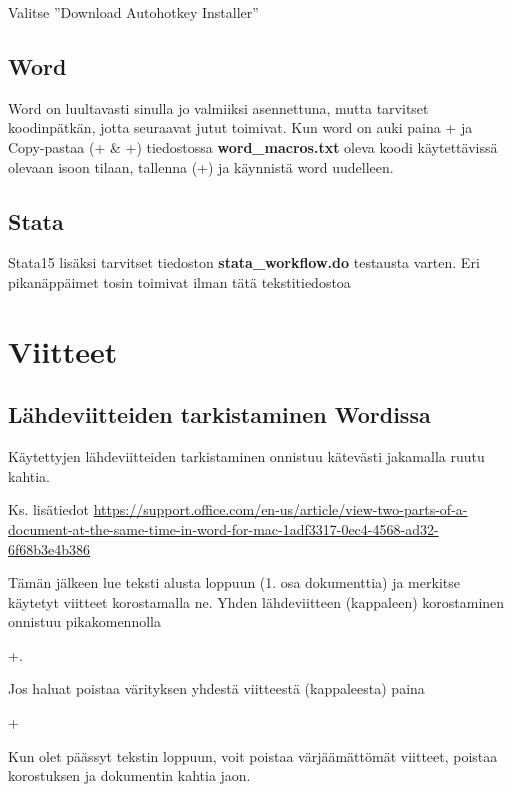 \documentclass[a5paper,9pt]{scrartcl}
\begin{document}
    Valitse ''Download Autohotkey Installer''
    \subsection{Word}
    Word on luultavasti sinulla  jo valmiiksi asennettuna, mutta tarvitset koodinpätkän, jotta seuraavat jutut toimivat. Kun word on auki paina + ja Copy-pastaa (+ \& +) tiedostossa \textbf{word\_macros.txt} oleva koodi käytettävissä olevaan isoon tilaan, tallenna (+) ja käynnistä word uudelleen.
    
    \subsection{Stata}
    Stata15 lisäksi tarvitset tiedoston \textbf{stata\_workflow.do} testausta varten. Eri pikanäppäimet tosin toimivat ilman tätä tekstitiedostoa

    
    \section{Viitteet}
    \subsection{Lähdeviitteiden tarkistaminen Wordissa}
    Käytettyjen lähdeviitteiden tarkistaminen onnistuu kätevästi jakamalla ruutu kahtia.
    
    
    
    Ks. lisätiedot \url{https://support.office.com/en-us/article/view-two-parts-of-a-document-at-the-same-time-in-word-for-mac-1adf3317-0ec4-4568-ad32-6f68b3e4b386}
    
    Tämän jälkeen lue teksti alusta loppuun (1. osa dokumenttia) ja merkitse käytetyt viitteet korostamalla ne. Yhden lähdeviitteen (kappaleen) korostaminen onnistuu pikakomennolla
    
    +. 
    
    Jos haluat poistaa värityksen yhdestä viitteestä (kappaleesta) paina
    
     +
     
    Kun olet päässyt tekstin loppuun, voit poistaa värjäämättömät viitteet, poistaa korostuksen ja dokumentin kahtia jaon.
    
\end{document}
